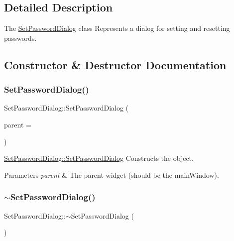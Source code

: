 \subsection{Detailed Description}
The \hyperlink{class_set_password_dialog}{Set\+Password\+Dialog} class Represents a dialog for setting and resetting passwords. 

\subsection{Constructor \& Destructor Documentation}
\hypertarget{class_set_password_dialog_a6c0f4e419cde5431401dd4deeccb1a54}{}\label{class_set_password_dialog_a6c0f4e419cde5431401dd4deeccb1a54} 
\subsubsection{\texorpdfstring{Set\+Password\+Dialog()}{SetPasswordDialog()}}
{\footnotesize\ttfamily Set\+Password\+Dialog\+::\+Set\+Password\+Dialog (\begin{DoxyParamCaption}\item[{Q\+Widget $\ast$}]{parent = {} }\end{DoxyParamCaption})\hspace{0.3cm}{\ttfamily [explicit]}}



\hyperlink{class_set_password_dialog_a6c0f4e419cde5431401dd4deeccb1a54}{Set\+Password\+Dialog\+::\+Set\+Password\+Dialog} Constructs the object. 


\begin{DoxyParams}{Parameters}
{\em parent} & The parent widget (should be the main\+Window). \\
\hline
\end{DoxyParams}
\hypertarget{class_set_password_dialog_ae3dec5f6c8b27800757c928e7e61468c}{}\label{class_set_password_dialog_ae3dec5f6c8b27800757c928e7e61468c} 
\subsubsection{\texorpdfstring{$\sim$\+Set\+Password\+Dialog()}{~SetPasswordDialog()}}
{\footnotesize\ttfamily Set\+Password\+Dialog\+::$\sim$\+Set\+Password\+Dialog (\begin{DoxyParamCaption}{ }\end{DoxyParamCaption})}



